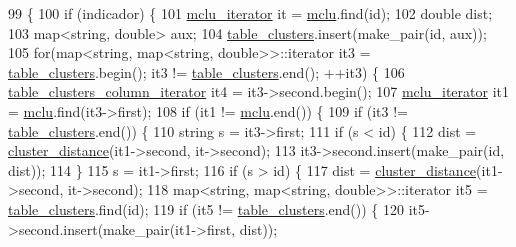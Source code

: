 \begin{DoxyCode}
99                                                                      \{
100     \textcolor{keywordflow}{if} (indicador) \{
101     \hyperlink{class_cjt___clusters_ad9cf46a8e1e6430c7b34b184f2756054}{mclu\_iterator} it = \hyperlink{class_cjt___clusters_a5f5e13255bca1fac2ad65c51473f6ead}{mclu}.find(\textcolor{keywordtype}{id});
102     \textcolor{keywordtype}{double} dist;
103     map<string, double> aux;
104     \hyperlink{class_cjt___clusters_a6af3fcf70683cdb88f137f6f51002939}{table\_clusters}.insert(make\_pair(\textcolor{keywordtype}{id}, aux));
105     \textcolor{keywordflow}{for}(map<\textcolor{keywordtype}{string}, map<string, double>>::iterator it3 = \hyperlink{class_cjt___clusters_a6af3fcf70683cdb88f137f6f51002939}{table\_clusters}.begin(); it3 != 
      \hyperlink{class_cjt___clusters_a6af3fcf70683cdb88f137f6f51002939}{table\_clusters}.end(); ++it3) \{
106         \hyperlink{class_cjt___clusters_abdef6142bd4683a878bb393a9095555e}{table\_clusters\_column\_iterator} it4 = it3->second.begin();
107         \hyperlink{class_cjt___clusters_ad9cf46a8e1e6430c7b34b184f2756054}{mclu\_iterator} it1 = \hyperlink{class_cjt___clusters_a5f5e13255bca1fac2ad65c51473f6ead}{mclu}.find(it3->first);
108         \textcolor{keywordflow}{if} (it1 != \hyperlink{class_cjt___clusters_a5f5e13255bca1fac2ad65c51473f6ead}{mclu}.end()) \{
109             \textcolor{keywordflow}{if} (it3 != \hyperlink{class_cjt___clusters_a6af3fcf70683cdb88f137f6f51002939}{table\_clusters}.end()) \{
110                 \textcolor{keywordtype}{string} s = it3->first;
111                 \textcolor{keywordflow}{if} (s < \textcolor{keywordtype}{id}) \{
112                     dist = \hyperlink{class_cjt___clusters_acd0e381a6b4c43933b3c6761febf9b3e}{cluster\_distance}(it1->second, it->second);
113                     it3->second.insert(make\_pair(\textcolor{keywordtype}{id}, dist));
114                 \}                    
115                 s = it1->first;        
116                 \textcolor{keywordflow}{if} (s > \textcolor{keywordtype}{id}) \{
117                     dist = \hyperlink{class_cjt___clusters_acd0e381a6b4c43933b3c6761febf9b3e}{cluster\_distance}(it1->second, it->second);
118                     map<string, map<string, double>>::iterator it5 = 
      \hyperlink{class_cjt___clusters_a6af3fcf70683cdb88f137f6f51002939}{table\_clusters}.find(\textcolor{keywordtype}{id});  
119                     \textcolor{keywordflow}{if} (it5 != \hyperlink{class_cjt___clusters_a6af3fcf70683cdb88f137f6f51002939}{table\_clusters}.end()) \{
120                         it5->second.insert(make\_pair(it1->first, dist));

\end{DoxyCode}
